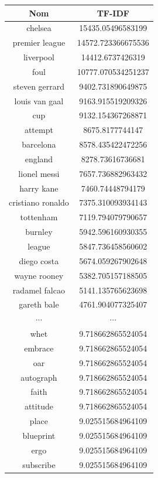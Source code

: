 \documentclass[a4paper, 12pt]{article}
\begin{document}
\newpage
\begin{figure}[!h]
\begin{center}
 \begin{tabular}{|c|c|}
 \hline
  \textbf{Nom} & \textbf{TF-IDF} \\
  \hline
  chelsea  & 15435.05496583199 \\
  premier league  & 14572.723366675536 \\
  liverpool  & 14412.6737426319 \\
  foul  & 10777.070534251237 \\
  steven gerrard  & 9402.731890649875 \\
  louis van gaal  & 9163.915519209326 \\
  cup  & 9132.154367268871 \\
  attempt  & 8675.8177744147 \\
  barcelona  & 8578.435422472256 \\
  england  & 8278.73616736681 \\
  lionel messi  & 7657.736882963432 \\
  harry kane  & 7460.74448794179 \\
  cristiano ronaldo  & 7375.310093934143 \\
  tottenham  & 7119.794079790657 \\
  burnley  & 5942.596160930355 \\
  league  & 5847.736458560602 \\
  diego costa  & 5674.059267902648 \\
  wayne rooney  & 5382.705157188505 \\
  radamel falcao  & 5141.135765623698 \\
  gareth bale  & 4761.904077325407 \\
 $\cdots$ & $\cdots$ \\
  whet  & 9.718662865524054 \\
  embrace  & 9.718662865524054 \\
  oar  & 9.718662865524054 \\
  autograph  & 9.718662865524054 \\
  faith  & 9.718662865524054 \\
  attitude  & 9.718662865524054 \\
  place  & 9.025515684964109 \\
  blueprint  & 9.025515684964109 \\
  ergo  & 9.025515684964109 \\
  subscribe  & 9.025515684964109 \\

\end{tabular}
\end{center}
\end{figure}
\end{document}
